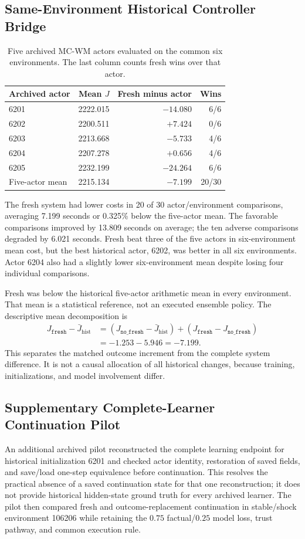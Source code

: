 \documentclass[journal]{IEEEtran}
\newcommand{\nf}{\texttt{no\_fresh}}
\newcommand{\fresh}{\texttt{fresh}}
\begin{document}
\subsection{Same-Environment Historical Controller Bridge}
\begin{table}[t]
\centering\caption{Five archived MC-WM actors evaluated on the common six environments. The last column counts fresh wins over that actor.}
\label{tab:historical}
\begin{tabular}{lrrr}\toprule
Archived actor & Mean $J$ & Fresh minus actor & Wins\\\midrule
6201 & 2222.015 & $-14.080$ & 6/6\\
6202 & 2200.511 & $+7.424$ & 0/6\\
6203 & 2213.668 & $-5.733$ & 4/6\\
6204 & 2207.278 & $+0.656$ & 4/6\\
6205 & 2232.199 & $-24.264$ & 6/6\\\midrule
Five-actor mean & 2215.134 & $-7.199$ & 20/30\\\bottomrule
\end{tabular}
\end{table}

The fresh system had lower costs in 20 of 30 actor/environment comparisons, averaging 7.199 seconds or 0.325\% below the five-actor mean. The favorable comparisons improved by 13.809 seconds on average; the ten adverse comparisons degraded by 6.021 seconds. Fresh beat three of the five actors in six-environment mean cost, but the best historical actor, 6202, was better in all six environments. Actor 6204 also had a slightly lower six-environment mean despite losing four individual comparisons.

Fresh was below the historical five-actor arithmetic mean in every environment. That mean is a statistical reference, not an executed ensemble policy. The descriptive mean decomposition is
\begin{align}
J_{\fresh}-\bar J_{\mathrm{hist}}
&=(J_{\nf}-\bar J_{\mathrm{hist}})+(J_{\fresh}-J_{\nf})\nonumber\\
&=-1.253-5.946=-7.199.
\end{align}
This separates the matched outcome increment from the complete system difference. It is not a causal allocation of all historical changes, because training, initializations, and model involvement differ.

\subsection{Supplementary Complete-Learner Continuation Pilot}
An additional archived pilot reconstructed the complete learning endpoint for historical initialization 6201 and checked actor identity, restoration of saved fields, and save/load one-step equivalence before continuation. This resolves the practical absence of a saved continuation state for that one reconstruction; it does not provide historical hidden-state ground truth for every archived learner. The pilot then compared fresh and outcome-replacement continuation in stable/shock environment 106206 while retaining the $0.75$ factual/$0.25$ model loss, trust pathway, and common execution rule.
\end{document}

